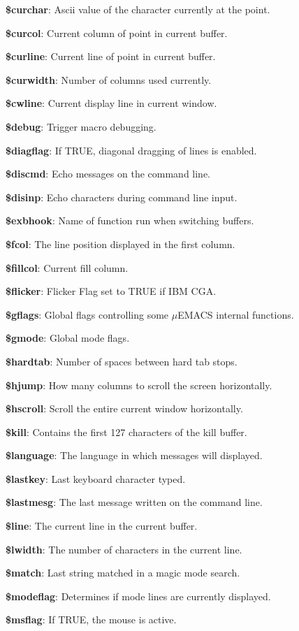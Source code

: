 {\bf \$curchar}: Ascii value of the character currently at the point.

{\bf \$curcol}: Current column of point in current buffer.

{\bf \$curline}: Current line of point in current buffer.

{\bf \$curwidth}: Number of columns used currently.

{\bf \$cwline}: Current display line in current window.

{\bf \$debug}: Trigger macro debugging.

{\bf \$diagflag}: If TRUE, diagonal dragging of lines is enabled.

{\bf \$discmd}: Echo messages on the command line.

{\bf \$disinp}: Echo characters during command line input.

{\bf \$exbhook}: Name of function run when switching buffers.

{\bf \$fcol}: The line position displayed in the first column.

{\bf \$fillcol}: Current fill column.

{\bf \$flicker}: Flicker Flag set to TRUE if IBM CGA.

{\bf \$gflags}: Global flags controlling some $\mu$EMACS internal functions.

{\bf \$gmode}: Global mode flags.

{\bf \$hardtab}: Number of spaces between hard tab stops.

{\bf \$hjump}: How many columns to scroll the screen horizontally.

{\bf \$hscroll}: Scroll the entire current window horizontally.

{\bf \$kill}: Contains the first 127 characters of the kill buffer.

{\bf \$language}: The language in which messages will displayed.

{\bf \$lastkey}: Last keyboard character typed.

{\bf \$lastmesg}: The last message written on the command line.

{\bf \$line}: The current line in the current buffer.

{\bf \$lwidth}: The number of characters in the current line.

{\bf \$match}: Last string matched in a magic mode search.

{\bf \$modeflag}: Determines if mode lines are currently displayed.

{\bf \$msflag}: If TRUE, the mouse is active.

